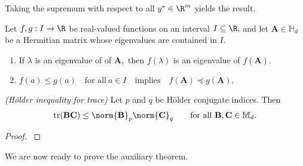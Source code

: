   Taking the supremum with respect to all 
  $y^*\in\R^m$
  yields the result.
\begin{proposition}
  Let
  $
  f,g: I\to \R
  $
  be real-valued functions on an interval $I\subseteq\R,$ 
  and let
  $\mathbf{A}\in \mathbb{H}_d$
  be a Hermitian matrix
  whose eigenvalues are contained in $I.$

  \begin{enumerate}[label={(\roman*)}]
    \item
      If $\lambda$ is an eigenvalue of of $\mathbf{A},$
      then $f(\lambda)$ is an eigenvalue of $f(\mathbf{A}).$
    \item
      $
        f(a)
        \le
        g(a)
        \quad
        \text{for all}\ 
        a\in I
        \quad
        \text{implies}
        \quad
        f(\mathbf{A})
        \preccurlyeq
        g(\mathbf{A})
        .
      $
  \end{enumerate}
\end{proposition}


\begin{proposition}
  \emph{(Hölder inequality for trace)}
  Let 
  $p$ and $q$
  be Hölder conjugate indices.
  Then
  \begin{gather}
    \mathrm{tr}
    (
    \mathbf{BC}
    )
    \le
    \norm{\mathbf{B}}_p
    \norm{\mathbf{C}}_q
    \qquad
    \text{for all}
    \ 
    \mathbf{B}
    ,
    \mathbf{C}
    \in 
    \mathbb{M}_d
    .
  \end{gather}
\end{proposition}
\begin{proof}
  \cite[Corollary~IV.2.6]{Bhatia1997}
\end{proof}
We are now ready to prove the auxiliary theorem.

